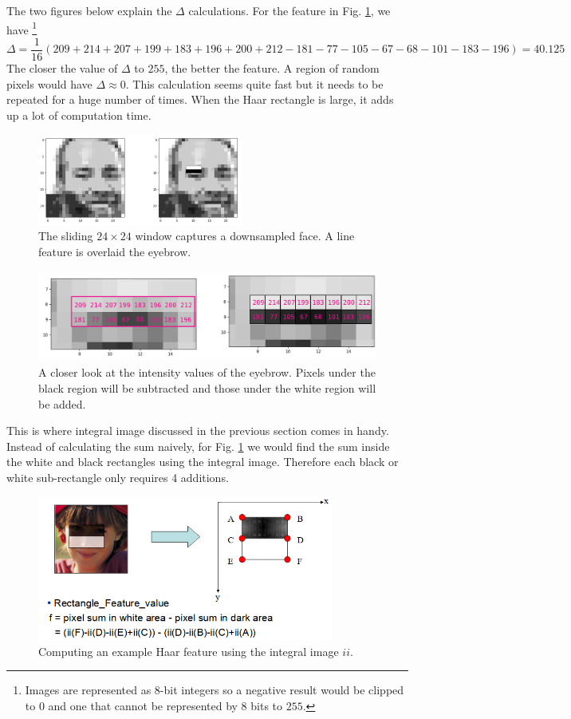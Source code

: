 \documentclass[a4paper]{article}
\begin{document}
The two figures below explain the $\Delta$ calculations. For the feature in Fig. \ref{fig:downsampled_eyebrow}, we have \footnote{Images are represented as 8-bit integers so a negative result would be clipped to 0 and one that cannot be represented by 8 bits to $255$.}
\[
\Delta = \frac{1}{16} (209 + 214 + 207 + 199 + 183 + 196 + 200+ 212 - 181 - 77 - 105 - 67 - 68-101 - 183 - 196) = 40.125
\]
The closer the value of $\Delta$ to $255$, the better the feature. A region of random pixels would have $\Delta \approx 0$. This calculation seems quite fast but it needs to be repeated for a huge number of times. When the Haar rectangle is large, it adds up a lot of computation time.
\begin{figure}[H]
    \centering
    \includegraphics[height=3cm]{img/downsampled_human_face.png}
    \caption{The sliding $24\times 24$ window captures a downsampled face. A line feature is overlaid the eyebrow.}
\end{figure}
\begin{figure}[H]
    \centering
    \includegraphics[height=3.0cm]{img/downsampled_human_eyebrow.png}
    \caption{A closer look at the intensity values of the eyebrow. Pixels  under the black region will be subtracted and those under the white region will be added.}
    \label{fig:downsampled_eyebrow}
\end{figure}
This is where integral image discussed in the previous section comes in handy. Instead of calculating the sum naively, for Fig. \ref{fig:downsampled_eyebrow} we would find the sum inside the white and black rectangles using the integral image. Therefore each black or white sub-rectangle only requires 4 additions. 
\begin{figure}[H]
    \centering
    \includegraphics[height=4.75cm]{img/haar_line_int_image.png}
    \caption{Computing an example Haar feature using the integral image $ii$.}
    \label{fig:my_label}
\end{figure}
\end{document}
